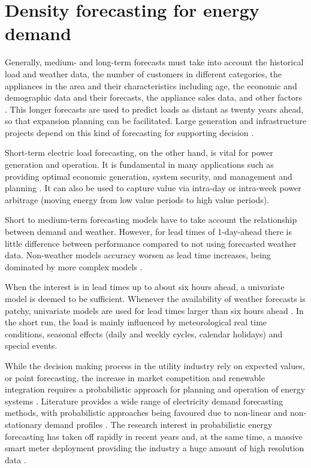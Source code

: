 \documentclass[preprint,3p,12pt,authoryear]{elsarticle}
\begin{document}
\section{Density forecasting for energy demand}
\label{sec:load_fcst}
Generally, medium- and long-term forecasts must take into account the historical load and weather data, the number of customers in different categories, the appliances in the area and their characteristics including age, the economic and demographic data and their forecasts, the appliance sales data, and other factors \citep{feinberg2005load}.
This longer forecasts are used to predict loads as distant as twenty years ahead, so that expansion planning can be facilitated.
Large generation and infrastructure projects depend on this kind of forecasting for supporting decision \citep{soliman1997application}.

Short-term electric load forecasting, on the other hand, is vital for power generation and operation.
It is fundamental in many applications such as providing optimal economic generation, system security, and management and planning \citep{Hamadi200447}.
It can also be used to capture value via intra-day or intra-week power arbitrage (moving energy from low value periods to high value periods).

Short to medium-term forecasting models have to take account the relationship between demand and weather.
However, for lead times of 1-day-ahead there is little difference between performance compared to not using forecasted weather data.
Non-weather models accuracy worsen as lead time increases, being dominated by more complex models \citep{TAYLOR200357}.

When the interest is in lead times up to about six hours ahead, a univariate model is deemed to be sufficient.
Whenever the availability of weather forecasts is patchy, univariate models are used for lead times larger than six hours ahead \citep{TAYLOR20061}.
In the short run, the load is mainly influenced by meteorological real time conditions, seasonal effects (daily and weekly cycles, calendar holidays) and special events.

While the decision making process in the utility industry rely on expected values, or point forecasting, the increase in market competition and renewable integration requires a probabilistic approach for planning and operation of energy systems \citep{HONG2016914}.
Literature provides a wide range of electricity demand forecasting methods, with probabilistic approaches being favoured due to non-linear and non-stationary demand profiles \citet{mocanu2016demand}.
The research interest in probabilistic energy forecasting has taken off rapidly in recent years \citep{Hong2016896} and, at the same time, a massive smart meter deployment providing the industry a huge amount of high resolution data \citep{HONG2016914}.
\end{document}
